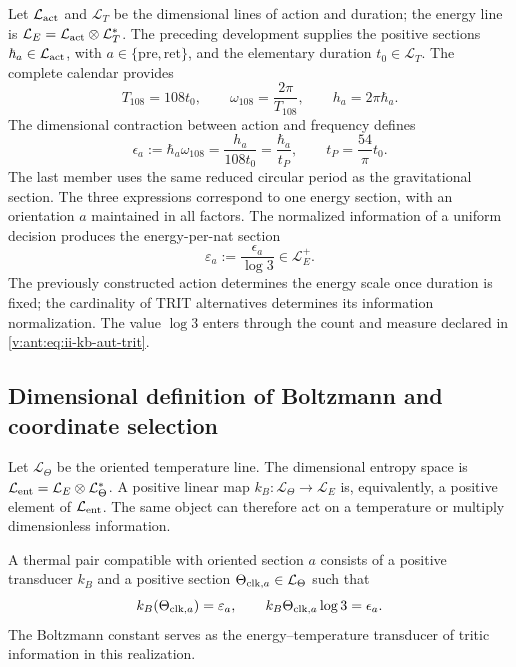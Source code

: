 Let \(\mathcal L_{\rm act}\) and \(\mathcal L_T\) be the dimensional
lines of action and duration; the energy line is
\(\mathcal L_E=\mathcal L_{\rm act}\otimes\mathcal L_T^*\).
The preceding development supplies the positive sections
\(\hbar_a\in\mathcal L_{\rm act}\), with
\(a\in\{\mathrm{pre},\mathrm{ret}\}\), and the elementary duration
\(t_0\in\mathcal L_T\). The complete calendar provides
\[
 T_{108}=108t_0,\qquad
 \omega_{108}=\frac{2\pi}{T_{108}},\qquad
 h_a=2\pi\hbar_a.
\]
The dimensional contraction between action and frequency defines
\begin{equation}
 \epsilon_a:=\hbar_a\omega_{108}
 =\frac{h_a}{108t_0}
 =\frac{\hbar_a}{t_P},\qquad
 t_P=\frac{54}{\pi}t_0.
 \label{v:ant:eq:ii-kb-aut-energia}
\end{equation}
The last member uses the same reduced circular period as the
gravitational section. The three expressions correspond to one
energy section, with an orientation \(a\) maintained in all
factors. The normalized information of a uniform decision
produces the energy-per-nat section
\begin{equation}
 \varepsilon_a:=\frac{\epsilon_a}{\log3}\in\mathcal L_E^+.
 \label{v:ant:eq:ii-kb-aut-energia-nat}
\end{equation}
The previously constructed action determines the energy scale once
duration is fixed; the cardinality of TRIT alternatives determines its
information normalization. The value \(\log3\) enters through the
count and measure declared in \eqref{v:ant:eq:ii-kb-aut-trit}.

\subsection{Dimensional definition of Boltzmann and coordinate selection}

Let \(\mathcal L_\Theta\) be the oriented temperature line.
The dimensional entropy space is
\(\mathcal L_{\rm ent}=\mathcal L_E\otimes\mathcal L_\Theta^*\).
A positive linear map
\(k_B:\mathcal L_\Theta\to\mathcal L_E\) is, equivalently,
a positive element of \(\mathcal L_{\rm ent}\). The same
object can therefore act on a temperature or multiply dimensionless
information.

\begin{definition}
A thermal pair compatible with oriented section \(a\) consists of
a positive transducer \(k_B\) and a positive section
\(\Theta_{{\rm clk},a}\in\mathcal L_\Theta\) such that
\begin{equation}
 k_B(\Theta_{{\rm clk},a})=\varepsilon_a,
 \qquad
 k_B\Theta_{{\rm clk},a}\log3=\epsilon_a.
 \label{v:ant:eq:ii-kb-aut-par-termico}
\end{equation}
The Boltzmann constant serves as the energy--temperature
transducer of tritic information in this realization.
\end{definition}

